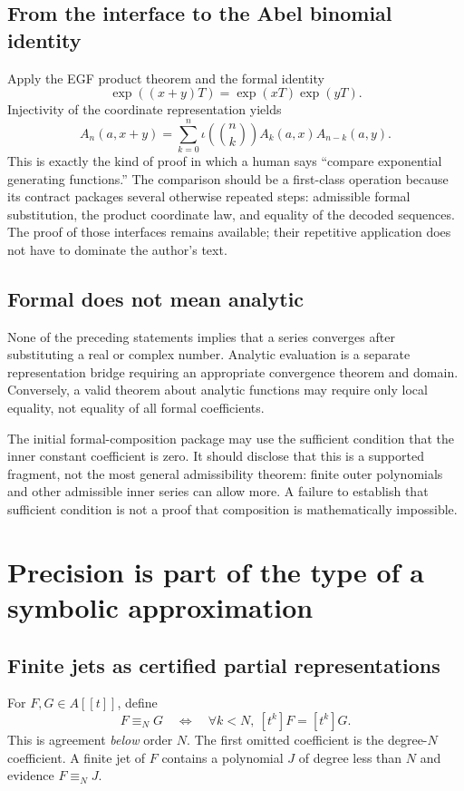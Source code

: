 \documentclass[11pt,a4paper]{article}
\newcommand{\coeff}[2]{[#1]#2}
\theoremstyle{definition}
\theoremstyle{remark}
\begin{document}
\subsection{From the interface to the Abel binomial identity}
Apply the EGF product theorem and the formal identity
\[
\exp((x+y)T)=\exp(xT)\exp(yT).
\]
Injectivity of the coordinate representation yields
\[
A_n(a,x+y)=\sum_{k=0}^{n}\iota\!\left(\binom nk\right)
 A_k(a,x)A_{n-k}(a,y).
\]
This is exactly the kind of proof in which a human says ``compare exponential generating functions.'' The comparison should be a first-class operation because its contract packages several otherwise repeated steps: admissible formal substitution, the product coordinate law, and equality of the decoded sequences. The proof of those interfaces remains available; their repetitive application does not have to dominate the author's text.

\subsection{Formal does not mean analytic}
None of the preceding statements implies that a series converges after substituting a real or complex number. Analytic evaluation is a separate representation bridge requiring an appropriate convergence theorem and domain. Conversely, a valid theorem about analytic functions may require only local equality, not equality of all formal coefficients.

The initial formal-composition package may use the sufficient condition that the inner constant coefficient is zero. It should disclose that this is a supported fragment, not the most general admissibility theorem: finite outer polynomials and other admissible inner series can allow more. A failure to establish that sufficient condition is not a proof that composition is mathematically impossible.

\section{Precision is part of the type of a symbolic approximation}\label{sec:precision}
\subsection{Finite jets as certified partial representations}
For $F,G\in A[[t]]$, define
\[
F\equiv_N G\quad\Longleftrightarrow\quad
\forall k<N,\ \coeff{t^k}{F}=\coeff{t^k}{G}.
\]
This is agreement \emph{below} order $N$. The first omitted coefficient is the degree-$N$ coefficient. A finite jet of $F$ contains a polynomial $J$ of degree less than $N$ and evidence $F\equiv_N J$.
\end{document}
